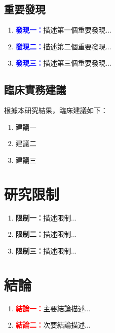 \documentclass[12pt,a4paper]{article}
\begin{document}
\subsection{重要發現}

\begin{enumerate}
    \item \textcolor{blue}{\textbf{發現一：}}描述第一個重要發現...
    \item \textcolor{blue}{\textbf{發現二：}}描述第二個重要發現...
    \item \textcolor{blue}{\textbf{發現三：}}描述第三個重要發現...
\end{enumerate}

\subsection{臨床實務建議}

\begin{tcolorbox}[
    colback=emergency_blue!5!white,
    colframe=emergency_blue,
    title=\textbf{重點提醒},
    fonttitle=\bfseries
]
根據本研究結果，臨床建議如下：
\begin{enumerate}
    \item 建議一
    \item 建議二
    \item 建議三
\end{enumerate}
\end{tcolorbox}

\section{研究限制}

\begin{enumerate}
    \item \textbf{限制一：}描述限制...
    \item \textbf{限制二：}描述限制...
    \item \textbf{限制三：}描述限制...
\end{enumerate}

\section{結論}

\begin{enumerate}
    \item \textcolor{red}{\textbf{結論一：}}主要結論描述...
    \item \textcolor{red}{\textbf{結論二：}}次要結論描述...
\end{enumerate}
\end{document}
